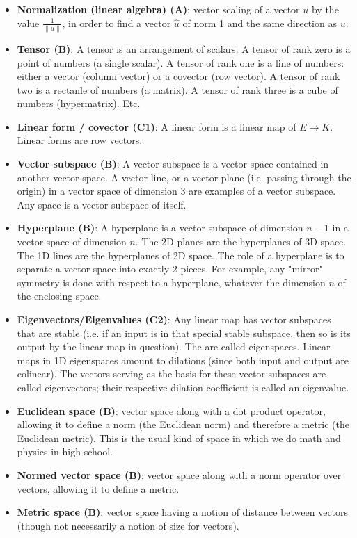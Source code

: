 \documentclass{article}
\begin{document}
\begin{itemize}
    \item \textbf{Normalization (linear algebra) (A)}: vector scaling of a vector $u$ by the value $\frac{1}{\|u\|}$, in order to find a vector $\hat{u}$ of norm 1 and the same direction as $u$.
    
    \item \textbf{Tensor (B)}: A tensor is an arrangement of scalars. A tensor of rank zero is a point of numbers (a single scalar). A tensor of rank one is a line of numbers: either a vector (column vector) or a covector (row vector). A tensor of rank two is a rectanle of numbers (a matrix). A tensor of rank three is a cube of numbers (hypermatrix). Etc.
    
    \item \textbf{Linear form / covector (C1)}: A linear form is a linear map of $E \rightarrow K$. Linear forms are row vectors.

    \item \textbf{Vector subspace (B)}: A vector subspace is a vector space contained in another vector space. A vector line, or a vector plane (i.e. passing through the origin) in a vector space of dimension 3 are examples of a vector subspace. Any space is a vector subspace of itself.
    
    \item \textbf{Hyperplane (B)}: A hyperplane is a vector subspace of dimension $n-1$ in a vector space of dimension $n$. The 2D planes are the hyperplanes of 3D space. The 1D lines are the hyperplanes of 2D space. The role of a hyperplane is to separate a vector space into exactly 2 pieces. For example, any "mirror" symmetry is done with respect to a hyperplane, whatever the dimension $n$ of the enclosing space.
    
    \item \textbf{Eigenvectors/Eigenvalues (C2)}: Any linear map has vector subspaces that are stable (i.e. if an input is in that special stable subspace, then so is its output by the linear map in question). The are called eigenspaces. Linear maps in 1D eigenspaces amount to dilations (since both input and output are colinear). The vectors serving as the basis for these vector subspaces are called eigenvectors; their respective dilation coefficient is called an eigenvalue.
    
    \item \textbf{Euclidean space (B)}: vector space along with a dot product operator, allowing it to define a norm (the Euclidean norm) and therefore a metric (the Euclidean metric). This is the usual kind of space in which we do math and physics in high school.
    
    \item \textbf{Normed vector space (B)}: vector space along with a norm operator over vectors, allowing it to define a metric.
    
    \item \textbf{Metric space (B)}: vector space having a notion of distance between vectors (though not necessarily a notion of size for vectors).
\end{itemize}
\end{document}
